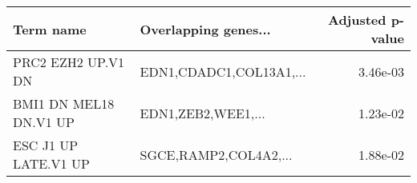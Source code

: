 \begin{tabular}{llr}
\toprule
             Term name &    Overlapping genes... &  Adjusted p-value \\
\midrule
    PRC2 EZH2 UP.V1 DN & EDN1,CDADC1,COL13A1,... &          3.46e-03 \\
BMI1 DN MEL18 DN.V1 UP &      EDN1,ZEB2,WEE1,... &          1.23e-02 \\
  ESC J1 UP LATE.V1 UP &   SGCE,RAMP2,COL4A2,... &          1.88e-02 \\
\bottomrule
\end{tabular}
